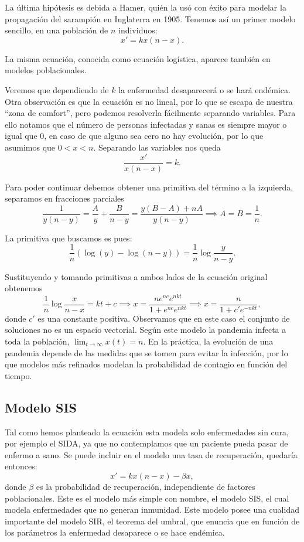 \documentclass[../ecuaciones_diferenciales.tex]{subfiles}
\begin{document}
La última hipótesis es debida a Hamer, quién la usó con éxito para modelar
la propagación del sarampión en Inglaterra en 1905. Tenemos así un primer
modelo sencillo, en una población de \(n\) individuos:
\[x' = k x(n - x).\]

\begin{remark}
	La misma ecuación, conocida como ecuación logística, aparece también en
	modelos poblacionales.
\end{remark}

Veremos que dependiendo de \(k\) la enfermedad desaparecerá o se hará endémica.
Otra observación es que la ecuación es no lineal, por lo que se escapa de
nuestra ``zona de comfort'', pero podemos resolverla fácilmente separando
variables. Para ello notamos que
el número de personas infectadas y sanas es siempre mayor o igual que 0, en caso
de que alguno sea cero no hay evolución, por lo que asumimos que \(0 < x < n\).
Separando las variables nos queda
\[\frac{x'}{x(n - x)} = k.\]

Para poder continuar debemos obtener una primitiva del término a la izquierda,
separamos en fracciones parciales
\[\frac{1}{y(n - y)} = \frac{A}{y} + \frac{B}{n - y}
	= \frac{y(B - A) + nA}{y(n - y)} \implies A = B = \frac{1}{n}.\]

La primitiva que buscamos es pues:
\[\frac{1}{n} (\log(y) - \log(n - y)) = \frac{1}{n} \log \frac{y}{n - y}.\]

Sustituyendo y tomando primitivas a ambos lados de la ecuación original obtenemos
\[\frac{1}{n} \log\frac{x}{n - x} = kt + c
	\implies x = \frac{n e^{nc} e^{nkt}}{1 + e^{nc} e^{nkt}}
	\implies x = \frac{n}{1 + c' e^{-nkt}},\]
donde \(c'\) es una constante positiva. Observamos que en este caso el
conjunto de soluciones no es un espacio vectorial. Según este modelo la
pandemia infecta a toda la población, \(\lim_{t \to \infty} x(t) = n\). En la
práctica, la evolución de una pandemia depende de las medidas que se tomen
para evitar la infección, por lo que modelos más refinados modelan la
probabilidad de contagio en función del tiempo.

\subsection{Modelo SIS}

Tal como hemos planteado la ecuación esta modela solo enfermedades sin cura, por
ejemplo el SIDA, ya que no contemplamos que un paciente pueda pasar de enfermo a
sano. Se puede incluir en el modelo una tasa de recuperación, quedaría entonces:
\[x' = k x(n - x) - \beta x,\]
donde \(\beta\) es la probabilidad de recuperación, independiente de factores
poblacionales. Este es el modelo más simple con nombre, el modelo SIS, el cual
modela enfermedades que no generan inmunidad. Este modelo posee una cualidad
importante del modelo SIR, el teorema del umbral, que enuncia que en función de
los parámetros la enfermedad desaparece o se hace endémica.
\end{document}
